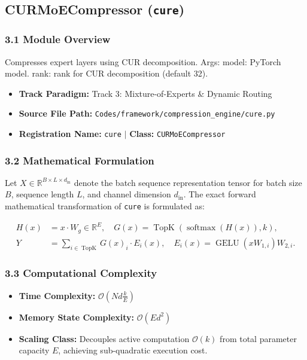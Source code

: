 \subsection{CURMoECompressor (\texttt{cure})}
\label{sec:app_module_cure}

\subsubsection*{3.1 Module Overview}
Compresses expert layers using CUR decomposition.  Args:     model: PyTorch model.     rank: rank for CUR decomposition (default 32).
\begin{itemize}
    \item \textbf{Track Paradigm:} Track 3: Mixture-of-Experts & Dynamic Routing
    \item \textbf{Source File Path:} \texttt{Codes/framework/compression\_engine/cure.py}
    \item \textbf{Registration Name:} \texttt{cure} $\mid$ \textbf{Class:} \texttt{CURMoECompressor}
\end{itemize}

\subsubsection*{3.2 Mathematical Formulation}
Let $X \in \mathbb{R}^{B \times L \times d_{\text{in}}}$ denote the batch sequence representation tensor for batch size $B$, sequence length $L$, and channel dimension $d_{\text{in}}$. The exact forward mathematical transformation of \texttt{cure} is formulated as:

\begin{align}
H(x) &= x \cdot W_g \in \mathbb{R}^{E}, \quad G(x) = \operatorname{TopK}\left(\operatorname{softmax}(H(x)), k\right), \\
Y &= \sum_{i \in \operatorname{TopK}} G(x)_i \cdot E_i(x), \quad E_i(x) = \operatorname{GELU}(x W_{1, i}) W_{2, i}.
\end{align}


\subsubsection*{3.3 Computational Complexity}
\begin{itemize}
    \item \textbf{Time Complexity:} $\mathcal{O}(N d \frac{k}{E})$
    \item \textbf{Memory State Complexity:} $\mathcal{O}(E d^2)$
    \item \textbf{Scaling Class:} Decouples active computation $\mathcal{O}(k)$ from total parameter capacity $E$, achieving sub-quadratic execution cost.
\end{itemize}

